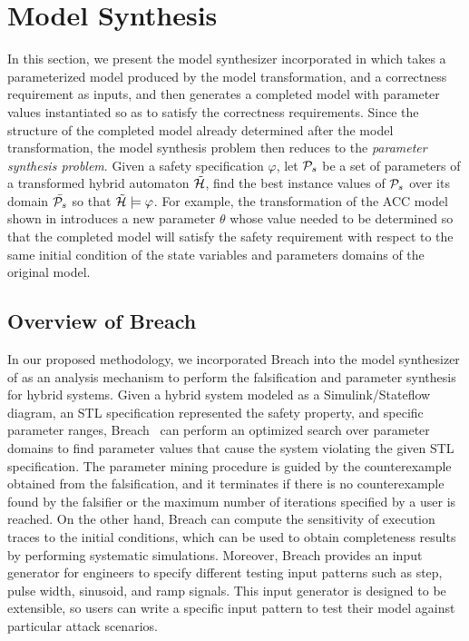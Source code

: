 \section{Model Synthesis}
%
In this section, we present the model synthesizer incorporated in \toolreaffirm which takes a parameterized model produced by the model transformation, and a correctness requirement as inputs, and then generates a completed model with parameter values instantiated so as to satisfy the correctness requirements. Since the structure of the completed model already determined after the model transformation, the model synthesis problem then reduces to the \emph{parameter synthesis problem}. Given a safety specification $\varphi$, let $\P_s$ be a set of parameters of a transformed hybrid automaton $\tilde{\AutomatonH}$, find the best instance values of $\P_s$ over its domain $\bar{\P_s}$ so that $\tilde{\AutomatonH} \models\varphi$.  
%
For example, the transformation of the ACC model shown in  introduces a new parameter $\theta$ whose value needed to be determined so that the completed model will satisfy the safety requirement with respect to the same initial condition of the state variables and parameters domains of the original model.
%
%
\subsection{Overview of Breach}
%
%
In our proposed methodology, we incorporated Breach into the model synthesizer of \toolreaffirm as an analysis mechanism to perform the falsification and parameter synthesis for hybrid systems. Given a hybrid system modeled as a Simulink/Stateflow diagram, an STL specification represented the safety property, and specific parameter ranges, Breach~\cite{donze2010breach} can perform an optimized search over parameter domains to find parameter values that cause the system violating the given STL specification. 
%
%
The parameter mining procedure is guided by the counterexample obtained from the falsification, and it terminates if there is no counterexample found by the falsifier or the maximum number of iterations specified by a user is reached.
%
On the other hand, Breach can compute the sensitivity of execution traces to the initial conditions, which can be used to obtain completeness results by performing systematic simulations. Moreover, Breach provides an input generator for engineers to specify different testing input patterns such as step, pulse width, sinusoid, and ramp signals. This input generator is designed to be extensible, so users can write a specific input pattern to test their model against particular attack scenarios.


